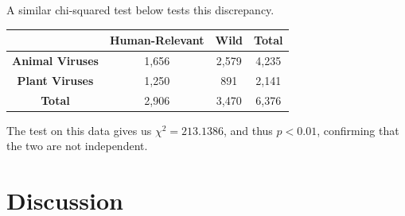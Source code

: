 \documentclass[12pt]{article}
\begin{document}

    A similar chi-squared test below tests this discrepancy.

    \begin{table}[H]
        \begin{tabular}{|c|c|c|c|}
        \hline
                                & \textbf{Human-Relevant} & \textbf{Wild} & \textbf{Total} \\ \hline
        \textbf{Animal Viruses} & 1,656                   & 2,579         & 4,235          \\ \hline
        \textbf{Plant Viruses}  & 1,250                   & 891           & 2,141          \\ \hline
        \textbf{Total}          & 2,906                   & 3,470         & 6,376          \\ \hline
        \end{tabular}
        \end{table}

    The test on this data gives us $\chi^2 = 213.1386$, and thus $p < 0.01$,
    confirming that the two are not independent.

    \section{Discussion} 
\end{document}
